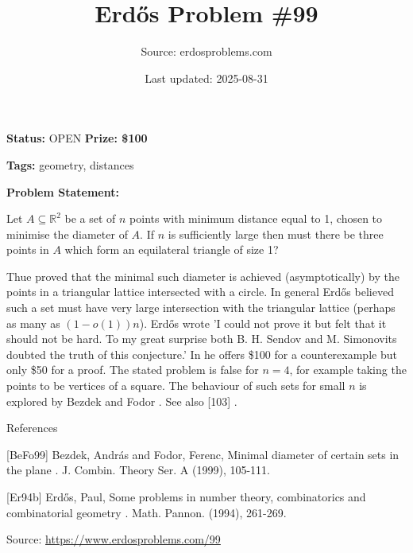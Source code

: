 \documentclass{article}
\title{Erd\H{o}s Problem \#99}
\date{Last updated: 2025-08-31}
\author{Source: erdosproblems.com}
\begin{document}
\maketitle

\noindent\textbf{Status:} OPEN \quad \textbf{Prize: \$100}

\noindent\textbf{Tags:} geometry, distances

\medskip

\noindent\textbf{Problem Statement:}

Let $A\subseteq\mathbb{R}^2$ be a set of $n$ points with minimum distance equal to 1, chosen to minimise the diameter of $A$. If $n$ is sufficiently large then must there be three points in $A$ which form an equilateral triangle of size 1?




Thue proved that the minimal such diameter is achieved (asymptotically) by the points in a triangular lattice intersected with a circle. In general Erd\H{o}s believed such a set must have very large intersection with the triangular lattice (perhaps as many as $(1-o(1))n$). Erd\H{o}s \cite{Er94b} wrote 'I could not prove it but felt that it should not be hard. To my great surprise both B. H. Sendov and M. Simonovits doubted the truth of this conjecture.' In \cite{Er94b} he offers \$100 for a counterexample but only \$50 for a proof. The stated problem is false for $n=4$, for example taking the points to be vertices of a square. The behaviour of such sets for small $n$ is explored by Bezdek and Fodor \cite{BeFo99}. See also [103] .




References

[BeFo99] Bezdek, Andr\'{a}s and Fodor, Ferenc, Minimal diameter of certain sets in the plane . J. Combin. Theory Ser. A (1999), 105-111.

[Er94b] Erd\H{o}s, Paul, Some problems in number theory, combinatorics and combinatorial geometry . Math. Pannon. (1994), 261-269.


\bigskip
\noindent\small{Source: \url{https://www.erdosproblems.com/99}}
\end{document}
